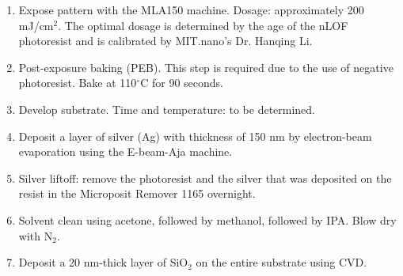 \documentclass{article}
\theoremstyle{definition}
\begin{document}
\begin{enumerate}[label=(\alph*)]
\item Expose pattern with the MLA150 machine. Dosage: approximately 200 mJ/cm$^2$. The optimal dosage is determined by the age of the nLOF photoresist and is calibrated by MIT.nano's Dr. Hanqing Li. 

\item Post-exposure baking (PEB). This step is required due to the use of negative photoresist. Bake at 110$^\circ$C for 90 seconds. 

\item Develop substrate. Time and temperature: to be determined.

\item Deposit a layer of silver (Ag) with thickness of 150 nm by electron-beam evaporation using the E-beam-Aja machine.

\item Silver liftoff: remove the photoresist and the silver that was deposited on the resist in the Microposit Remover 1165 overnight. 

\item Solvent clean using acetone, followed by methanol, followed by IPA. Blow dry with N$_2$.

\item Deposit a 20 nm-thick layer of SiO$_2$ on the entire substrate using CVD.

\end{enumerate}
\end{document}
